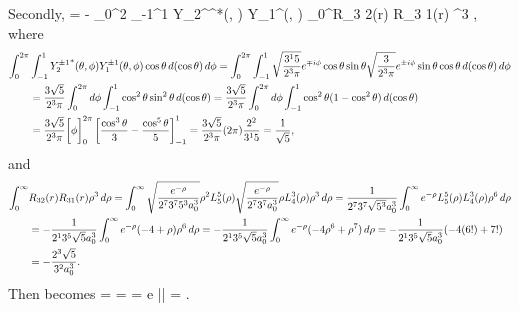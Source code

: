 \begin{solution}
	Secondly,
	\beqn \label{v2}
		 = - \int_0^{2\pi} \int_{-1}^1 {Y_2^{}}^*(\tht, \phi) Y_1^{}(\tht, \phi) \cos\tht \dcost \dphi \int_0^\infty R_{3 2}(r) R_{3 1}(r) \rho^3 \drho,
	\eeqn
	where
	\begin{align*}
		\int_0^{2\pi} &\int_{-1}^1 {Y_2^{\pm1}}^*(\theta, \phi) Y_1^{\pm1}(\theta, \phi) \cos\theta \dd{(\cos\theta)} \dd{\phi}
		= \int_0^{2\pi} \int_{-1}^1 \sqrt{\frac{3^1 5}{2^3 \pi}} e^{\mp i \phi} \cos\theta \sin\theta \sqrt{\frac{3}{2^3 \pi}} e^{\pm i \phi} \sin\theta \cos\theta \dd{(\cos\theta)} \dd{\phi} \\
		&= \frac{3 \sqrt{5}}{2^3 \pi} \int_0^{2\pi} \dd{\phi} \int_{-1}^1 \cos^2\theta \sin^2\theta \dd{(\cos\theta)}
		= \frac{3 \sqrt{5}}{2^3 \pi} \int_0^{2\pi} \dd{\phi} \int_{-1}^1 \cos^2\theta (1 - \cos^2\theta) \dd{(\cos\theta)} \\
		&= \frac{3 \sqrt{5}}{2^3 \pi} \bigg[ \phi \bigg]_0^{2\pi} \left[ \frac{\cos^3\theta}{3} - \frac{\cos^5\theta}{5} \right]_{-1}^1
		= \frac{3 \sqrt{5}}{2^3 \pi} (2\pi) \frac{2^2}{3^1 5}
		= \frac{1}{\sqrt{5}},
	\end{align*}
	and
	\begin{align*}
		\int_0^\infty &R_{3 2}(r) R_{3 1}(r) \rho^3 \dd{\rho}
		= \int_0^\infty \sqrt{\frac{e^{-\rho}}{2^7 3^7 5^3 a_0^3}} \rho^2 L_5^5(\rho) \sqrt{\frac{e^{-\rho}}{2^7 3^7 a_0^3}} \rho L_4^3(\rho) \rho^3 \dd{\rho}
		= \frac{1}{2^7 3^7 \sqrt{5^3} a_0^3} \int_0^\infty e^{-\rho} L_5^5(\rho) L_4^3(\rho) \rho^6 \dd{\rho} \\
		&= -\frac{1}{2^1 3^5 \sqrt{5} a_0^3} \int_0^\infty e^{-\rho} (-4 + \rho) \rho^6 \dd{\rho}
		= -\frac{1}{2^1 3^5 \sqrt{5} a_0^3} \int_0^\infty e^{-\rho} (-4 \rho^6 + \rho^7) \dd{\rho}
		= -\frac{1}{2^1 3^5 \sqrt{5} a_0^3} (-4 (6!) + 7!) \\
		&= -\frac{2^3 \sqrt{5}}{3^2 a_0^3}.
	\end{align*}
	Then  becomes
	\beq
		 =   
		= 
		=  e |\vE| \ao
		= .
	\eeq
	

\end{solution}
